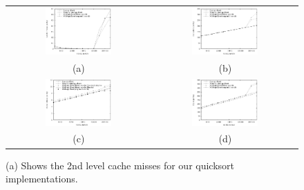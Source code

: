 \documentclass[acmtocl]{acmtrans2m}
\begin{document}
\begin{figure}
\centering
\begin{tabular}{cc}
\includegraphics[width=0.48\textwidth]{plots/quicksort_cache_misses.eps} & \includegraphics[width=0.48\textwidth]{plots/quicksort_instruction_counts.eps} \\
(a) & (b) \\ 
\includegraphics[width=0.48\textwidth]{plots/quicksort_branch_misses.eps} & \includegraphics[width=0.48\textwidth]{plots/quicksort_cycles.eps} \\
(c) & (d) \\
\end{tabular}
\caption{(a) Shows the 2nd level cache misses for our quicksort implementations.
}
\end{figure}
\end{document}
